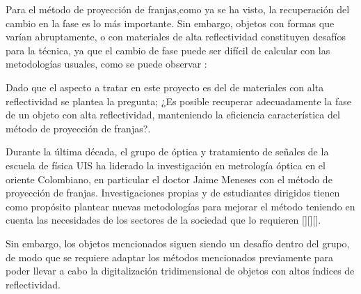\documentclass[UTF8]{article}
\begin{document}
Para el método de proyección de franjas,como ya se ha visto, la recuperación del cambio en la fase es lo más importante. Sin embargo, objetos con formas que varían abruptamente, o con materiales de alta reflectividad constituyen desafíos para la técnica, ya que el cambio de fase puede ser difícil de calcular con las metodologías usuales, como se puede observar : 

Dado que el aspecto a tratar en este proyecto es del de materiales con alta reflectividad se plantea la pregunta; ¿Es posible recuperar adecuadamente la fase de un objeto con alta reflectividad, manteniendo la eficiencia característica del método de proyección de franjas?.

Durante la última década, el grupo de óptica y tratamiento de señales de la escuela de física UIS ha liderado la investigación en metrología óptica en el oriente Colombiano, en particular el doctor Jaime Meneses con el método de proyección de franjas. Investigaciones propias y de estudiantes dirigidos tienen como propósito plantear nuevas metodologías para mejorar el método teniendo en cuenta las necesidades de los sectores de la sociedad que lo requieren [][][].


%
Sin embargo, los objetos mencionados siguen siendo un desafío dentro del grupo, de modo que se requiere adaptar los métodos mencionados previamente para poder llevar a cabo la digitalización tridimensional de objetos con altos índices de reflectividad. 




\end{document}

